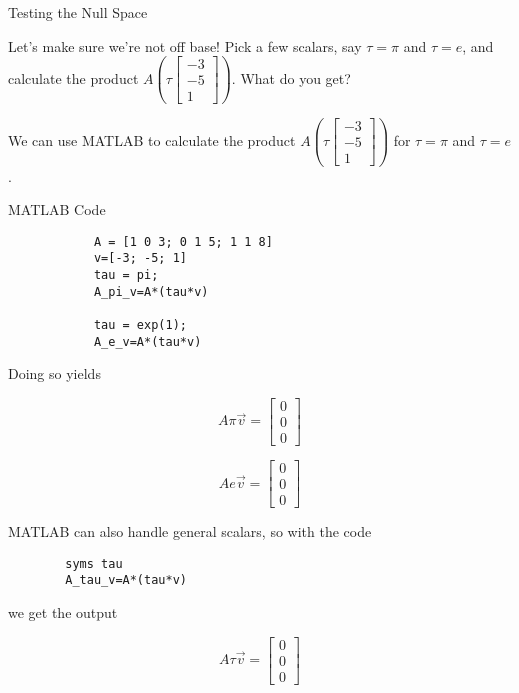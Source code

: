 \documentclass{ximera}
\begin{document}
\begin{problem}{Testing the Null Space}

Let's make sure we're not off base! Pick a few scalars, say $\tau=\pi$ and $\tau=e$, and calculate the product $A\left(\tau\begin{bmatrix} -3 \\ -5 \\ 1 \end{bmatrix}\right)$. What do you get?

\begin{solution}

    We can use MATLAB to calculate the product $A\left(\tau\begin{bmatrix} -3 \\ -5 \\ 1 \end{bmatrix}\right)$ for $\tau=\pi$ and $\tau=e$.

    \begin{hint}{MATLAB Code}
        \begin{verbatim}
            A = [1 0 3; 0 1 5; 1 1 8]
            v=[-3; -5; 1]
            tau = pi;
            A_pi_v=A*(tau*v)
            
            tau = exp(1);
            A_e_v=A*(tau*v)
        \end{verbatim}
    \end{hint}

    Doing so yields

    $$A\pi\vec{v}=\begin{bmatrix} 0 \\ 0 \\ 0 \end{bmatrix}$$

    $$Ae\vec{v}=\begin{bmatrix} 0 \\ 0 \\ 0 \end{bmatrix}$$

    MATLAB can also handle general scalars, so with the code


    \begin{verbatim}
        syms tau
        A_tau_v=A*(tau*v)
    \end{verbatim}

    we get the output

    $$A\tau\vec{v}=\begin{bmatrix} 0 \\ 0 \\ 0 \end{bmatrix}$$
    

\end{solution}

\end{problem}
\end{document}
